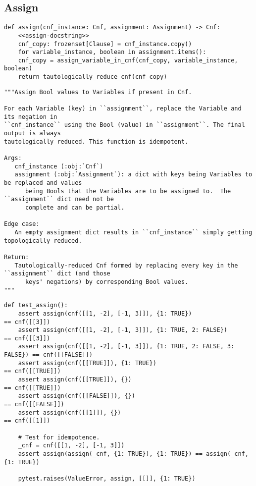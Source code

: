 \documentclass[11pt]{article}
\begin{document}
\subsection{Assign}
\label{sec:orgda79807}

\begin{verbatim}
def assign(cnf_instance: Cnf, assignment: Assignment) -> Cnf:
    <<assign-docstring>>
    cnf_copy: frozenset[Clause] = cnf_instance.copy()
    for variable_instance, boolean in assignment.items():
	cnf_copy = assign_variable_in_cnf(cnf_copy, variable_instance, boolean)
    return tautologically_reduce_cnf(cnf_copy)
\end{verbatim}

\begin{verbatim}
"""Assign Bool values to Variables if present in Cnf.

For each Variable (key) in ``assignment``, replace the Variable and its negation in
``cnf_instance`` using the Bool (value) in ``assignment``. The final output is always
tautologically reduced. This function is idempotent.

Args:
   cnf_instance (:obj:`Cnf`)
   assignment (:obj:`Assignment`): a dict with keys being Variables to be replaced and values
      being Bools that the Variables are to be assigned to.  The ``assignment`` dict need not be
      complete and can be partial.

Edge case:
   An empty assignment dict results in ``cnf_instance`` simply getting topologically reduced.

Return:
   Tautologically-reduced Cnf formed by replacing every key in the ``assignment`` dict (and those
      keys' negations) by corresponding Bool values.
"""
\end{verbatim}


\begin{verbatim}
def test_assign():
    assert assign(cnf([[1, -2], [-1, 3]]), {1: TRUE})                     == cnf([[3]])
    assert assign(cnf([[1, -2], [-1, 3]]), {1: TRUE, 2: FALSE})           == cnf([[3]])
    assert assign(cnf([[1, -2], [-1, 3]]), {1: TRUE, 2: FALSE, 3: FALSE}) == cnf([[FALSE]])
    assert assign(cnf([[TRUE]]), {1: TRUE})                               == cnf([[TRUE]])
    assert assign(cnf([[TRUE]]), {})                                      == cnf([[TRUE]])
    assert assign(cnf([[FALSE]]), {})                                     == cnf([[FALSE]])
    assert assign(cnf([[1]]), {})                                         == cnf([[1]])

    # Test for idempotence.
    _cnf = cnf([[1, -2], [-1, 3]])
    assert assign(assign(_cnf, {1: TRUE}), {1: TRUE}) == assign(_cnf, {1: TRUE})

    pytest.raises(ValueError, assign, [[]], {1: TRUE})
\end{verbatim}
\end{document}
